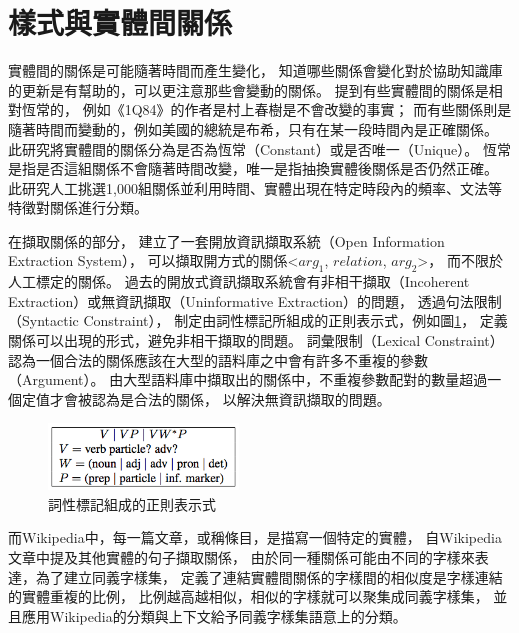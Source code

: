
%
%
\section{樣式與實體間關係}

實體間的關係是可能隨著時間而產生變化，
知道哪些關係會變化對於協助知識庫的更新是有幫助的，可以更注意那些會變動的關係。
\cite{relationsByTime} 提到有些實體間的關係是相對恆常的，
例如《1Q84》的作者是村上春樹是不會改變的事實；
而有些關係則是隨著時間而變動的，例如美國的總統是布希，只有在某一段時間內是正確關係。
此研究將實體間的關係分為是否為恆常（Constant）或是否唯一（Unique）。
恆常是指是否這組關係不會隨著時間改變，唯一是指抽換實體後關係是否仍然正確。
此研究人工挑選1,000組關係並利用時間、實體出現在特定時段內的頻率、文法等特徵對關係進行分類。

在擷取關係的部分，
\cite{reverb} 建立了一套開放資訊擷取系統（Open Information Extraction System），
可以擷取開方式的關係<$arg_1$, $relation$, $arg_2$>，
而不限於人工標定的關係。
過去的開放式資訊擷取系統會有非相干擷取（Incoherent Extraction）或無資訊擷取（Uninformative Extraction）的問題，
透過句法限制（Syntactic Constraint），
制定由詞性標記所組成的正則表示式，例如圖\ref{i:reverb-pos}，
定義關係可以出現的形式，避免非相干擷取的問題。
詞彙限制（Lexical Constraint）認為一個合法的關係應該在大型的語料庫之中會有許多不重複的參數（Argument）。
由大型語料庫中擷取出的關係中，不重複參數配對的數量超過一個定值才會被認為是合法的關係，
以解決無資訊擷取的問題。

\begin{figure}
    \centering
    \includegraphics[width=0.45\textwidth]{images/02-reverb-pos}
    \caption{詞性標記組成的正則表示式}
    \label{i:reverb-pos}
\end{figure}

而Wikipedia中，每一篇文章，或稱條目，是描寫一個特定的實體，
\cite{wisenet} 自Wikipedia文章中提及其他實體的句子擷取關係，
由於同一種關係可能由不同的字樣來表達，為了建立同義字樣集，
定義了連結實體間關係的字樣間的相似度是字樣連結的實體重複的比例，
比例越高越相似，相似的字樣就可以聚集成同義字樣集，
並且應用Wikipedia的分類與上下文給予同義字樣集語意上的分類。


